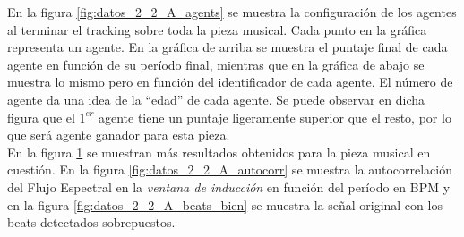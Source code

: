 \documentclass[12pt,a4paper,titlepage]{report}
\begin{document}
En la figura \ref{fig:datos_2_2_A_agents} se muestra la configuración de los agentes al terminar el tracking sobre toda la pieza musical. Cada punto en la gráfica representa un agente. En la gráfica de arriba se muestra el puntaje final de cada agente en función de su período final, mientras que en la gráfica de abajo se muestra lo mismo pero en función del identificador de cada agente. El número de agente da una idea de la ``edad'' de cada agente. Se puede observar en dicha figura que el $1^{er}$ agente tiene un puntaje ligeramente superior que el resto, por lo que será agente ganador para esta pieza.\\

En la figura \ref{fig:datos_2_2_A} se muestran más resultados obtenidos para la pieza musical en cuestión. En la figura \ref{fig:datos_2_2_A_autocorr} se muestra la autocorrelación del Flujo Espectral en la \emph{ventana de inducción} en función del período en BPM y en la figura \ref{fig:datos_2_2_A_beats_bien} se muestra la señal original con los beats detectados sobrepuestos.\\

\begin{figure} [h!]
\centering
  \caption{}
  \label{fig:datos_2_2_A}
\end{figure}
\end{document}
